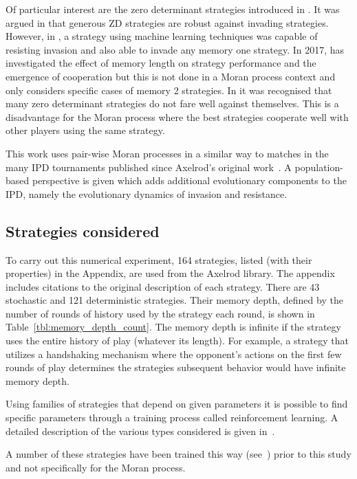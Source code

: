 \documentclass[10pt,letterpaper]{article}
\begin{document}
Of particular interest are the zero determinant strategies introduced in
\cite{Press2012}. It was argued in \cite{stewart2013extortion} that generous
ZD strategies are robust against invading strategies. However, in \cite{Lee2015},
a strategy using machine learning techniques was capable of resisting invasion
and also able to invade any memory one strategy. In 2017, \cite{Hilbe2017}
has investigated the effect of memory length on strategy performance and the
emergence of cooperation but this is not done in a Moran process context and only
considers specific cases of memory 2 strategies. In \cite{Adami2013} it was
recognised that many zero determinant strategies do not fare well against
themselves. This is a disadvantage for the Moran process where the best
strategies cooperate well with other players using the same strategy.

This work uses pair-wise Moran processes in a similar way to matches in the many
IPD tournaments published since Axelrod's original work~\cite{Axelrod1980a}.
A population-based perspective is given which adds additional
evolutionary components to the IPD, namely the evolutionary dynamics of invasion
and resistance.

\subsection*{Strategies considered}\label{sec:strategies}

To carry out this numerical experiment, 164
strategies, listed (with their properties) in the Appendix,
are used from the Axelrod library. The appendix includes citations to the
original description of each strategy. There are
43 stochastic and
121 deterministic strategies. Their memory depth,
defined by the number of rounds of history used by the strategy each round, is
shown in Table~\ref{tbl:memory_depth_count}. The memory depth is infinite if the
strategy uses the entire history of play (whatever its length). For example, a
strategy that utilizes a handshaking mechanism where the opponent's actions on
the first few rounds of play determines the strategies subsequent behavior would
have infinite memory depth.

Using families of strategies that depend on given parameters it is possible to
find specific parameters through a training process called reinforcement
learning. A detailed description of the various types considered is given
in~\cite{Harper2017}.

A number of these strategies have been trained this way (see~\cite{Harper2017})
prior to this study and not specifically for the Moran process.
\end{document}
